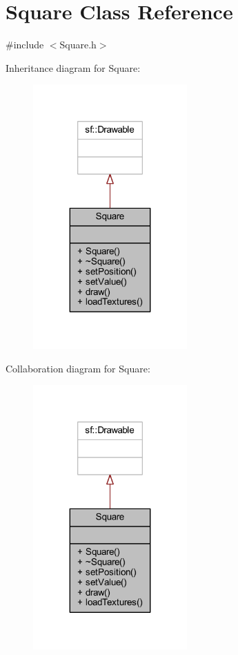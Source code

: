 \hypertarget{class_square}{}\section{Square Class Reference}
\label{class_square}


{\ttfamily \#include $<$Square.\+h$>$}



Inheritance diagram for Square\+:\nopagebreak
\begin{figure}[H]
\begin{center}
\leavevmode
\includegraphics[width=167pt]{class_square__inherit__graph}
\end{center}
\end{figure}


Collaboration diagram for Square\+:\nopagebreak
\begin{figure}[H]
\begin{center}
\leavevmode
\includegraphics[width=167pt]{class_square__coll__graph}
\end{center}
\end{figure}

